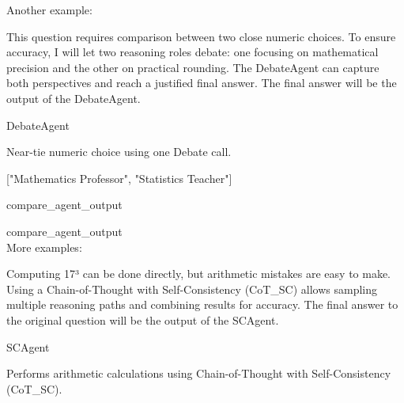 \begin{userprompt}[title={User Prompt}]
Another example:\\


This question requires comparison between two close numeric choices.
To ensure accuracy, I will let two reasoning roles debate: one focusing on mathematical precision and the other on practical rounding.
The DebateAgent can capture both perspectives and reach a justified final answer.
The final answer will be the output of the DebateAgent.



\quad{}DebateAgent

\quad{}
Near-tie numeric choice using one Debate call.

\quad{}

\qquad{}

\qquad{}
["Mathematics Professor", "Statistics Teacher"]

\quad{}

\quad{}
compare_agent_output


compare_agent_output\\

More examples:\\


Computing 17³ can be done directly, but arithmetic mistakes are easy to make.
Using a Chain-of-Thought with Self-Consistency (CoT\_SC) allows sampling multiple reasoning paths and combining results for accuracy.
The final answer to the original question will be the output of the SCAgent.



\quad{}SCAgent

\quad{}
Performs arithmetic calculations using Chain-of-Thought with Self-Consistency (CoT\_SC).

\quad{}

\qquad{}


\end{userprompt}
